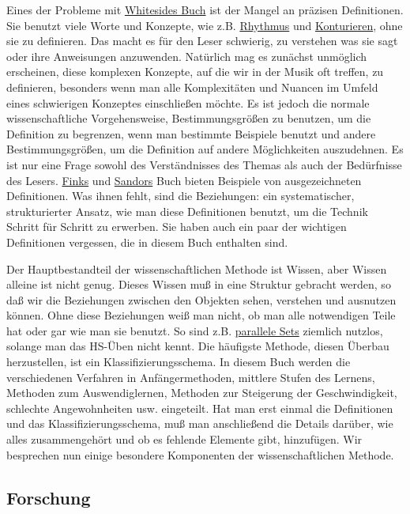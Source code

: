 Eines der Probleme mit \hyperlink{Whiteside}{Whitesides Buch} ist der Mangel an präzisen Definitionen.
 Sie benutzt viele Worte und Konzepte, wie z.B. \hyperlink{c1iii1b}{Rhythmus} und \hyperlink{c1iii8}{Konturieren}, ohne sie zu definieren.
 Das macht es für den Leser schwierig, zu verstehen was sie sagt oder ihre Anweisungen anzuwenden.
 Natürlich mag es zunächst unmöglich erscheinen, diese komplexen Konzepte, auf die wir in der Musik oft treffen, zu definieren, besonders wenn man alle Komplexitäten und Nuancen im Umfeld eines schwierigen Konzeptes einschließen möchte.
 Es ist jedoch die normale wissenschaftliche Vorgehensweise, Bestimmungsgrößen zu benutzen, um die Definition zu begrenzen, wenn man bestimmte Beispiele benutzt und andere Bestimmungsgrößen, um die Definition auf andere Möglichkeiten auszudehnen.
 Es ist nur eine Frage sowohl des Verständnisses des Themas als auch der Bedürfnisse des Lesers.
 \hyperlink{Fink}{Finks} und \hyperlink{Sandor}{Sandors} Buch bieten Beispiele von ausgezeichneten Definitionen.
 Was ihnen fehlt, sind die Beziehungen: ein systematischer, strukturierter Ansatz, wie man diese Definitionen benutzt, um die Technik Schritt für Schritt zu erwerben.
 Sie haben auch ein paar der wichtigen Definitionen vergessen, die in diesem Buch enthalten sind.
 

Der Hauptbestandteil der wissenschaftlichen Methode ist Wissen, aber Wissen alleine ist nicht genug.
 Dieses Wissen muß in eine Struktur gebracht werden, so daß wir die Beziehungen zwischen den Objekten sehen, verstehen und ausnutzen können.
 Ohne diese Beziehungen weiß man nicht, ob man alle notwendigen Teile hat oder gar wie man sie benutzt.
 So sind z.B. \hyperlink{c1ii11}{parallele Sets} ziemlich nutzlos, solange man das HS-Üben nicht kennt.
 Die häufigste Methode, diesen Überbau herzustellen, ist ein Klassifizierungsschema.
 In diesem Buch werden die verschiedenen Verfahren in Anfängermethoden, mittlere Stufen des Lernens, Methoden zum Auswendiglernen, Methoden zur Steigerung der Geschwindigkeit, schlechte Angewohnheiten usw. eingeteilt.
 Hat man erst einmal die Definitionen und das Klassifizierungsschema, muß man anschließend die Details darüber, wie alles zusammengehört und ob es fehlende Elemente gibt, hinzufügen.
 Wir besprechen nun einige besondere Komponenten der wissenschaftlichen Methode.
 \hypertarget{c3_3c}{}

\subsection{Forschung}

